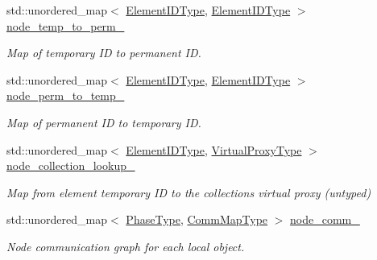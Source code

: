 \begin{DoxyCompactItemize}
std\+::unordered\+\_\+map$<$ \hyperlink{namespacevt_1_1vrt_1_1collection_1_1balance_a14c8d2c972f2913aa3f1636e5be0a120}{Element\+I\+D\+Type}, \hyperlink{namespacevt_1_1vrt_1_1collection_1_1balance_a14c8d2c972f2913aa3f1636e5be0a120}{Element\+I\+D\+Type} $>$ \hyperlink{structvt_1_1vrt_1_1collection_1_1balance_1_1_node_stats_a77870b801c582f3f497e8bc3d885902d}{node\+\_\+temp\+\_\+to\+\_\+perm\+\_\+}
\begin{DoxyCompactList}\small\item\em Map of temporary ID to permanent ID. \end{DoxyCompactList}\item 
std\+::unordered\+\_\+map$<$ \hyperlink{namespacevt_1_1vrt_1_1collection_1_1balance_a14c8d2c972f2913aa3f1636e5be0a120}{Element\+I\+D\+Type}, \hyperlink{namespacevt_1_1vrt_1_1collection_1_1balance_a14c8d2c972f2913aa3f1636e5be0a120}{Element\+I\+D\+Type} $>$ \hyperlink{structvt_1_1vrt_1_1collection_1_1balance_1_1_node_stats_a1891fa27b425a3e99cac4c17fc6da97c}{node\+\_\+perm\+\_\+to\+\_\+temp\+\_\+}
\begin{DoxyCompactList}\small\item\em Map of permanent ID to temporary ID. \end{DoxyCompactList}\item 
std\+::unordered\+\_\+map$<$ \hyperlink{namespacevt_1_1vrt_1_1collection_1_1balance_a14c8d2c972f2913aa3f1636e5be0a120}{Element\+I\+D\+Type}, \hyperlink{namespacevt_a1b417dd5d684f045bb58a0ede70045ac}{Virtual\+Proxy\+Type} $>$ \hyperlink{structvt_1_1vrt_1_1collection_1_1balance_1_1_node_stats_ac21ddf1bec029ea8dde5a1b221db7c46}{node\+\_\+collection\+\_\+lookup\+\_\+}
\begin{DoxyCompactList}\small\item\em Map from element temporary ID to the collection\textquotesingle{}s virtual proxy (untyped) \end{DoxyCompactList}\item 
std\+::unordered\+\_\+map$<$ \hyperlink{namespacevt_a46ce6733d5cdbd735d561b7b4029f6d7}{Phase\+Type}, \hyperlink{namespacevt_1_1vrt_1_1collection_1_1balance_a10860c956804d644db54a16012352728}{Comm\+Map\+Type} $>$ \hyperlink{structvt_1_1vrt_1_1collection_1_1balance_1_1_node_stats_ad07d8cd0a63ec07559711162e0da8157}{node\+\_\+comm\+\_\+}
\begin{DoxyCompactList}\small\item\em Node communication graph for each local object. \end{DoxyCompactList}\item 

\end{DoxyCompactItemize}
